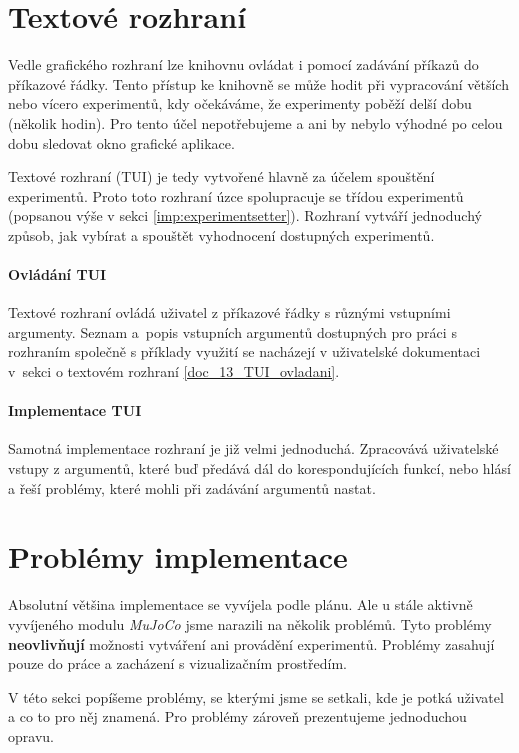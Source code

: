 \section{Textové rozhraní} \label{imp:TUI}
Vedle grafického rozhraní lze knihovnu ovládat i pomocí zadávání příkazů do
příkazové řádky. Tento přístup ke knihovně se může hodit při vypracování
větších nebo vícero experimentů, kdy očekáváme, že experimenty poběží delší
dobu (několik hodin). Pro tento účel nepotřebujeme a ani by nebylo
výhodné po celou dobu sledovat okno grafické aplikace.

Textové rozhraní (TUI) je tedy vytvořené hlavně za účelem spouštění
experimentů. Proto toto rozhraní úzce spolupracuje se třídou experimentů
(popsanou výše v sekci \ref{imp:experimentsetter}). Rozhraní vytváří jednoduchý
způsob, jak vybírat a spouštět vyhodnocení dostupných experimentů.

\paragraph{Ovládání TUI}
Textové rozhraní ovládá uživatel z příkazové řádky s různými vstupními
argumenty. Seznam a~popis vstupních argumentů dostupných pro práci s rozhraním
společně s příklady využití se nacházejí v uživatelské dokumentaci v~sekci o
textovém rozhraní \ref{doc_13_TUI_ovladani}.

\paragraph{Implementace TUI}
Samotná implementace rozhraní je již velmi jednoduchá. Zpracovává uživatelské
vstupy z argumentů, které buď předává dál do korespondujících funkcí, nebo
hlásí a řeší problémy, které mohli při zadávání argumentů nastat.

\section{Problémy implementace} \label{imp:problems}
Absolutní většina implementace se vyvíjela podle plánu. Ale u stále aktivně
vyvíjeného modulu \emph{MuJoCo} jsme narazili na několik problémů. Tyto
problémy \textbf{neovlivňují} možnosti vytváření ani provádění experimentů.
Problémy zasahují pouze do práce a zacházení s vizualizačním prostředím.

V této sekci popíšeme problémy, se kterými jsme se setkali, kde je potká
uživatel a co to pro něj znamená. Pro problémy zároveň prezentujeme jednoduchou
opravu.

